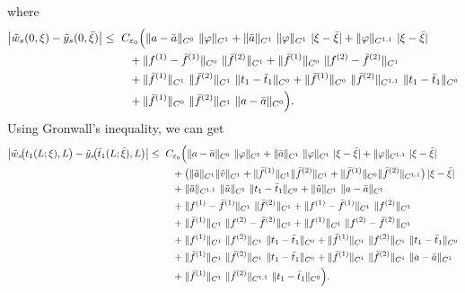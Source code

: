 \documentclass[a4paper,reqno,11pt]{amsart}
\numberwithin{equation}{section} %
\begin{document}
where
\[
\begin{aligned}
\bigl|\tilde w_s(0,\xi)-\tilde y_s(0,\bar\xi)\bigr|
\le{}&\ C_{\varepsilon_0}\Bigl(
  \|a-\bar a\|_{C^{0}}\ \|\varphi\|_{C^{1}}
  + \|\bar a\|_{C^{1}}\ \|\varphi\|_{C^{1}}\ |\xi-\bar\xi|
  + \|\varphi\|_{C^{1,1}}\ |\xi-\bar\xi| \\
&\quad + \|f^{(1)}-\bar f^{(1)}\|_{C^{0}}\ \|\bar f^{(2)}\|_{C^{1}}
  + \|\bar f^{(1)}\|_{C^{0}}\ \|f^{(2)}-\bar f^{(2)}\|_{C^{1}} \\
&\quad + \|\bar f^{(1)}\|_{C^{1}}\ \|\bar f^{(2)}\|_{C^{1}}\ \|t_1-\bar t_1\|_{C^{0}}
  + \|\bar f^{(1)}\|_{C^{0}}\ \|\bar f^{(2)}\|_{C^{1,1}}\ \|t_1-\bar t_1\|_{C^{0}} \\
&\quad + \|\bar f^{(1)}\|_{C^{0}}\ \|\bar f^{(2)}\|_{C^{1}}\ \|a-\bar a\|_{C^{0}}
\Bigr).
\end{aligned}
\]
Using Gronwall's inequality, we can get
\[
\begin{aligned}
\bigl|\tilde w_s\!\bigl(t_1(L;\xi),L\bigr)-\tilde y_s\!\bigl(\bar t_1(L;\bar\xi),L\bigr)\bigr|
\le{}&\ C_{\varepsilon_0}\Bigl(
  \|a-\bar a\|_{C^{0}}\ \|\varphi\|_{C^{1}}
  + \|\bar a\|_{C^{1}}\ \|\varphi\|_{C^{1}}\ |\xi-\bar\xi|
  + \|\varphi\|_{C^{1,1}}\ |\xi-\bar\xi|
\\
&\quad
  + \bigl(\|\tilde a\|_{C^{1}}\|\tilde v\|_{C^{1}}
     + \|\bar f^{(1)}\|_{C^{1}}\|\bar f^{(2)}\|_{C^{1}}
     + \|\bar f^{(1)}\|_{C^{0}}\|\bar f^{(2)}\|_{C^{1,1}}\bigr)\,|\xi-\bar\xi|
\\
&\quad
  + \|\tilde a\|_{C^{1,1}}\ \|\tilde u\|_{C^{1}}\ \|t_1-\bar t_1\|_{C^{0}}
  + \|\tilde u\|_{C^{1}}\ \|a-\bar a\|_{C^{1}}
\\
&\quad
  + \|f^{(1)}-\bar f^{(1)}\|_{C^{1}}\ \|\bar f^{(2)}\|_{C^{1}}
  + \|f^{(1)}-\bar f^{(1)}\|_{C^{1}}\ \|f^{(2)}\|_{C^{1}}
\\
&\quad
  + \|\bar f^{(1)}\|_{C^{1}}\ \|f^{(2)}-\bar f^{(2)}\|_{C^{1}}
  + \|f^{(1)}\|_{C^{1}}\ \|f^{(2)}-\bar f^{(2)}\|_{C^{1}}
\\
&\quad
  + \|f^{(1)}\|_{C^{1}}\ \|f^{(2)}\|_{C^{1}}\ \|t_1-\bar t_1\|_{C^{0}}
  + \|\bar f^{(1)}\|_{C^{1}}\ \|f^{(2)}\|_{C^{1}}\ \|t_1-\bar t_1\|_{C^{0}}
\\
&\quad
  + \|\bar f^{(1)}\|_{C^{1}}\ \|\bar f^{(2)}\|_{C^{1}}\ \|t_1-\bar t_1\|_{C^{0}}
  + \|\bar f^{(1)}\|_{C^{1}}\ \|\bar f^{(2)}\|_{C^{1}}\ \|a-\bar a\|_{C^{1}}
\\
&\quad
  + \|\bar f^{(1)}\|_{C^{1}}\ \|\bar f^{(2)}\|_{C^{1,1}}\ \|t_1-\bar t_1\|_{C^{0}}
\Bigr).
\end{aligned}
\]
\end{document}
